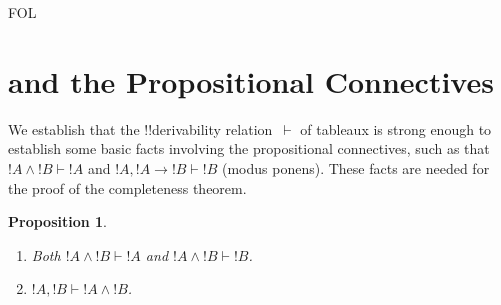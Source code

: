 \documentclass[10pt,a4paper]{article}
\theoremstyle{plain}
\newtheorem{prop}[thm]{Proposition}
\theoremstyle{definition}
\theoremstyle{remark}
\newenvironment{explain}{}{}
\newcommand*{\olfileid}[3]{}
\newcommand*{\olsection}[1]{\section*{#1}}
\newcommand*{\ollabel}[1]{\label{#1}}
\providecommand{\lif}{\mathbin{\rightarrow}}
\providecommand{\Proves}{\mathrel{\vdash}}
\providecommand{\iftag}[1]{#1}
\begin{document}




\iftag{FOL}
      {\olfileid{fol}{tab}{ppr}}
      {\olfileid{pl}{tab}{ppr}}

\olsection{ and the Propositional Connectives}

\begin{explain}
  We establish that the !!{derivability} relation~$\Proves$ of
  tableaux is strong enough to establish some basic facts involving
  the propositional connectives, such as that $!A \land !B \Proves !A$
  and $!A, !A \lif !B \Proves !B$ (modus ponens). These facts are
  needed for the proof of the completeness theorem.
\end{explain}

\begin{prop}\ollabel{prop:provability-land}
  \begin{enumerate}
  \item \ollabel{prop:provability-land-left} Both $!A \land !B \Proves
    !A$ and $!A \land !B \Proves !B$.
  \item \ollabel{prop:provability-land-right} $!A, !B \Proves !A \land
    !B$.
  \end{enumerate}
\end{prop}
\end{document}
